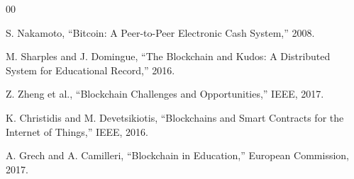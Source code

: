 \documentclass[conference]{IEEEtran}
\begin{document}
\begin{thebibliography}{00}

 S. Nakamoto, ``Bitcoin: A Peer-to-Peer Electronic Cash System,'' 2008.

 M. Sharples and J. Domingue, ``The Blockchain and Kudos: A Distributed System for Educational Record,'' 2016.

 Z. Zheng et al., ``Blockchain Challenges and Opportunities,'' IEEE, 2017.

 K. Christidis and M. Devetsikiotis, ``Blockchains and Smart Contracts for the Internet of Things,'' IEEE, 2016.

 A. Grech and A. Camilleri, ``Blockchain in Education,'' European Commission, 2017.

\end{thebibliography}
\end{document}
